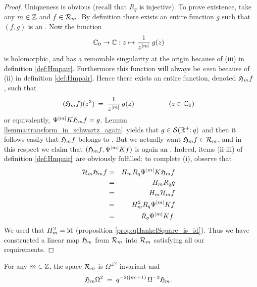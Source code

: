 \begin{proof}
Uniqueness is obvious (recall that $R_q$ is injective). To prove existence,
take any $m\in\mathbb{Z}$ and $f \in{\mathcal R}_{m}$. By definition there exists
an entire function $g$ such that $(f,g)$ is an \Hmpair\@.
Now the function
$$ \mathbb{C}_0 \rightarrow \mathbb{C} : z \mapsto \frac{1}{z^{|m|}}\, g(z)$$
is holomorphic, and has a removable singularity at the origin because
of (iii) in definition \ref{def:Hmpair}\@.
Furthermore this function will always be {\em even\/} because of (ii)
in definition \ref{def:Hmpair}\@.
Hence there exists an entire function, denoted $\mathfrak{H}_{m}f$, such that
$$ (\mathfrak{H}_{m}f)(z^2)
         \:=\:   \frac{1}{z^{|m|}}\, g(z) \hspace{5em} (z\in \mathbb{C}_0) $$
or equivalently, $\Psi^{|m|} K \mathfrak{H}_{m}f = g$.
Lemma \ref{lemma:transform_in_schwartz_again}\ yields that $g \in {\mathcal S}(\mathbb{R}^+;q)$
and then it follows easily that $\mathfrak{H}_{m}f$ belongs to \Swqbis\@.
But we actually want $\mathfrak{H}_{m}f\in {\mathcal R}_{m}$, and
in this respect we claim that $(\mathfrak{H}_{m}f, \Psi^{|m|} K f)$ is again an \Hmpair\@.
Indeed, items (ii-iii) of definition \ref{def:Hmpair}\ are
obviously fulfilled; to complete (i), observe that
\begin{eqnarray*}
   {\mathcal H}_{m} \mathfrak{H}_{m} f
&=&
   H_m R_q \Psi^{|m|} K \mathfrak{H}_{m} f
\\&=&
   H_m R_q g
\\&=&
   H_m {\mathcal H}_{m} f
\\&=&
   H_m^2 R_q \Psi^{|m|} K f
\\&=&
   R_q \Psi^{|m|} K f.
\end{eqnarray*}
We used that $H_m^2=\mbox{\rm id}$ (proposition \ref{prop:qHankelSquare_is_id}).
Thus we have constructed a linear map $\mathfrak{H}_{m}$ from ${\mathcal R}_{m}$ into
${\mathcal R}_{m}$ satisfying all our requirements.
\end{proof}




\begin{prop} \label{prop:holS:Omega_invariant}
For any\/ $m\in \mathbb{Z}$, the space\/ ${\mathcal R}_{m}$ is\/ $\Omega^{\pm 2}$-invariant and
\begin{equation}\label{eq:holS:Omega_invariant}
  \mathfrak{H}_{m} \Omega^2 \;=\; q^{-2(|m|+1)}\, \Omega^{-2} \mathfrak{H}_{m}.
\end{equation}
\end{prop}


